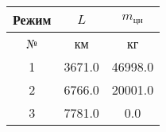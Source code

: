 \begin{tabular}{|c|c|c|}
\hline
Режим & $L$ & $m_{цн}$ \\ 
\hline
№ & км & кг \\ 
\hline
1 & 3671.0 & 46998.0 \\ 
\hline
2 & 6766.0 & 20001.0 \\ 
\hline
3 & 7781.0 & 0.0 \\ 
\hline
\end{tabular}